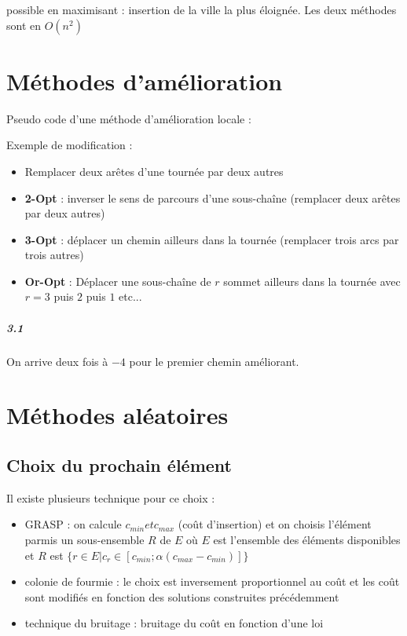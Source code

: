 \documentclass[11pt,a4paper]{report}
\begin{document}
possible en maximisant : insertion de la ville la plus éloignée. Les deux méthodes sont en $O(n^2)$


\chapter{Méthodes d'amélioration}

Pseudo code d'une méthode d'amélioration locale :

\begin{algorithm}[H]
\end{algorithm}

Exemple de modification :
\begin{itemize}
    \item Remplacer deux arêtes d'une tournée par deux autres
    \item \textbf{2-Opt} : inverser le sens de parcours d'une sous-chaîne (remplacer deux arêtes par deux autres)
    \item \textbf{3-Opt} : déplacer un chemin ailleurs dans la tournée (remplacer trois arcs par trois autres)
    \item \textbf{Or-Opt} : Déplacer une sous-chaîne de $r$ sommet ailleurs dans la tournée avec $r = 3$ puis $2$ puis $1$ etc...
\end{itemize}

\paragraph*{3.1} On arrive deux fois à $-4$ pour le premier chemin améliorant.

\chapter{Méthodes aléatoires}

\section{Choix du prochain élément}

Il existe plusieurs technique pour ce choix :
\begin{itemize}
    \item GRASP : on calcule $c_{min} et c_{max}$ (coût d'insertion) et on choisis l'élément parmis un sous-ensemble $R$ de $E$ où $E$ est l'ensemble des éléments disponibles et $R$ est $\{r \in E | c_{r} \in [c_{min};\alpha(c_{max}-c_{min})]\}$
    \item colonie de fourmie : le choix est inversement proportionnel au coût et les coût sont modifiés en fonction des solutions construites précédemment
    \item technique du bruitage : bruitage du coût en fonction d'une loi
\end{itemize}
\end{document}
